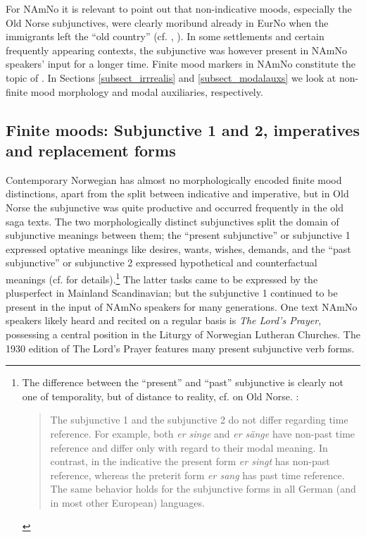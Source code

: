 \documentclass[output=paper]{langscibook}
\begin{document}
For NAmNo it is relevant to point out that non-indicative moods, especially the Old Norse subjunctives, were clearly moribund already in EurNo when the immigrants left the “old country” (cf. \citealt{Eide2010}, \citealt{Hjelde1992}). In some settlements and certain frequently appearing contexts, the subjunctive was however present in NAmNo speakers’ input for a longer time. Finite mood markers in NAmNo constitute the topic of . In Sections \ref{subsect_irrrealis} and \ref{subsect_modalauxs} we look at non-finite mood morphology and modal auxiliaries, respectively. 

\subsection{Finite moods: Subjunctive 1 and 2, imperatives and replacement forms}
\label{bkm:Ref159263343}
Contemporary Norwegian has almost no morphologically encoded finite mood distinctions, apart from the split between indicative and imperative, but in Old Norse the subjunctive was quite productive and occurred frequently in the old saga texts. The two morphologically distinct subjunctives split the domain of subjunctive meanings between them; the “present subjunctive” or subjunctive 1 expressed optative meanings like desires, wants, wishes, demands, and the “past subjunctive” or subjunctive 2 expressed hypothetical and counterfactual meanings (cf. \citealt{Eide2010} for details).\footnote{The difference between the “present” and “past” subjunctive is clearly not one of temporality, but of distance to reality, cf. \citet[142]{Iversen1990} on Old Norse. \citet[319]{Thieroff2004}: 

\begin{quote}
The subjunctive 1 and the subjunctive 2 do not differ regarding time reference. For example, both \textit{er singe} and \textit{er sänge} have non-past time reference and differ only with regard to their modal meaning. In contrast, in the indicative the present form \textit{er singt} has non-past reference, whereas the preterit form \textit{er sang} has past time reference. The same behavior holds for the subjunctive forms in all German (and in most other European) languages.
\end{quote}
}  
The latter tasks came to be expressed by the plusperfect in Mainland Scandinavian; but the subjunctive 1 continued to be present in the input of NAmNo speakers for many generations. One text NAmNo speakers likely heard and recited on a regular basis is \textit{The Lord’s Prayer}, possessing a central position in the Liturgy of Norwegian Lutheran Churches. The 1930 edition of The Lord’s Prayer features many present subjunctive verb forms.
\end{document}
